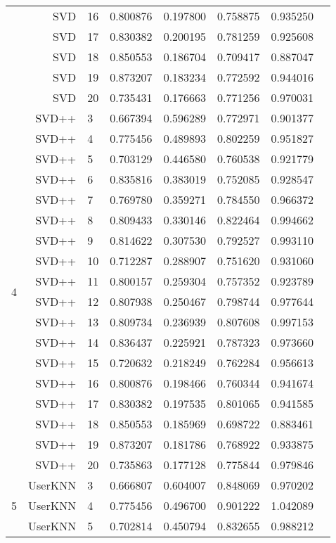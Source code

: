 \documentclass[a4paper,12pt]{article}
\begin{document}
\begin{center}
\begin{longtable}{lrlrrrrr}
& SVD & 16 & 0.800876 & 0.197800 & 0.758875 & 0.935250 \\
& SVD & 17 & 0.830382 & 0.200195 & 0.781259 & 0.925608 \\
& SVD & 18 & 0.850553 & 0.186704 & 0.709417 & 0.887047 \\
& SVD & 19 & 0.873207 & 0.183234 & 0.772592 & 0.944016 \\
& SVD & 20 & 0.735431 & 0.176663 & 0.771256 & 0.970031 \\ \hline
\multirow{18}{1cm}{4} & SVD++ & 3 & 0.667394 & 0.596289 & 0.772971 & 0.901377 \\
& SVD++ & 4 & 0.775456 & 0.489893 & 0.802259 & 0.951827 \\
& SVD++ & 5 & 0.703129 & 0.446580 & 0.760538 & 0.921779 \\
& SVD++ & 6 & 0.835816 & 0.383019 & 0.752085 & 0.928547 \\
& SVD++ & 7 & 0.769780 & 0.359271 & 0.784550 & 0.966372 \\
& SVD++ & 8 & 0.809433 & 0.330146 & 0.822464 & 0.994662 \\
& SVD++ & 9 & 0.814622 & 0.307530 & 0.792527 & 0.993110 \\
& SVD++ & 10 & 0.712287 & 0.288907 & 0.751620 & 0.931060 \\
& SVD++ & 11 & 0.800157 & 0.259304 & 0.757352 & 0.923789 \\
& SVD++ & 12 & 0.807938 & 0.250467 & 0.798744 & 0.977644 \\
& SVD++ & 13 & 0.809734 & 0.236939 & 0.807608 & 0.997153 \\
& SVD++ & 14 & 0.836437 & 0.225921 & 0.787323 & 0.973660 \\
& SVD++ & 15 & 0.720632 & 0.218249 & 0.762284 & 0.956613 \\
& SVD++ & 16 & 0.800876 & 0.198466 & 0.760344 & 0.941674 \\
& SVD++ & 17 & 0.830382 & 0.197535 & 0.801065 & 0.941585 \\
& SVD++ & 18 & 0.850553 & 0.185969 & 0.698722 & 0.883461 \\
& SVD++ & 19 & 0.873207 & 0.181786 & 0.768922 & 0.933875 \\
& SVD++ & 20 & 0.735863 & 0.177128 & 0.775844 & 0.979846 \\ \hline
\multirow{18}{1cm}{5} & UserKNN & 3 & 0.666807 & 0.604007 & 0.848069 & 0.970202 \\
& UserKNN & 4 & 0.775456 & 0.496700 & 0.901222 & 1.042089 \\
& UserKNN & 5 & 0.702814 & 0.450794 & 0.832655 & 0.988212 \\

\end{longtable}
\end{center}
\end{document}

